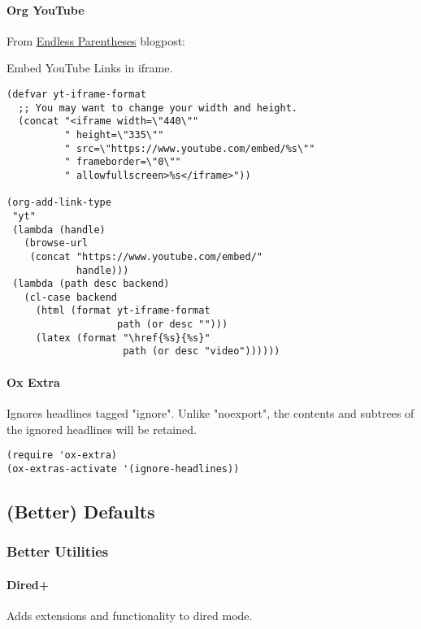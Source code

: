 \documentclass[11pt]{article}
\begin{document}
\paragraph*{Org YouTube}
\label{sec:org0043460}
From \href{http://endlessparentheses.com/embedding-youtube-videos-with-org-mode-links.html}{Endless Parentheses} blogpost:

Embed YouTube Links in iframe.

\begin{verbatim}
(defvar yt-iframe-format
  ;; You may want to change your width and height.
  (concat "<iframe width=\"440\""
          " height=\"335\""
          " src=\"https://www.youtube.com/embed/%s\""
          " frameborder=\"0\""
          " allowfullscreen>%s</iframe>"))

(org-add-link-type
 "yt"
 (lambda (handle)
   (browse-url
    (concat "https://www.youtube.com/embed/"
            handle)))
 (lambda (path desc backend)
   (cl-case backend
     (html (format yt-iframe-format
                   path (or desc "")))
     (latex (format "\href{%s}{%s}"
                    path (or desc "video"))))))
\end{verbatim}

\paragraph*{Ox Extra}
\label{sec:org491ee5f}

Ignores headlines tagged "ignore". Unlike "noexport", the contents and
subtrees of the ignored headlines will be retained.

\begin{verbatim}
(require 'ox-extra)
(ox-extras-activate '(ignore-headlines))
\end{verbatim}

\subsection*{(Better) Defaults}
\label{sec:orgafa7857}
\subsubsection*{Better Utilities}
\label{sec:orgc4194a0}
\paragraph*{Dired+}
\label{sec:org15198ba}

Adds extensions and functionality to dired mode.
\end{document}
